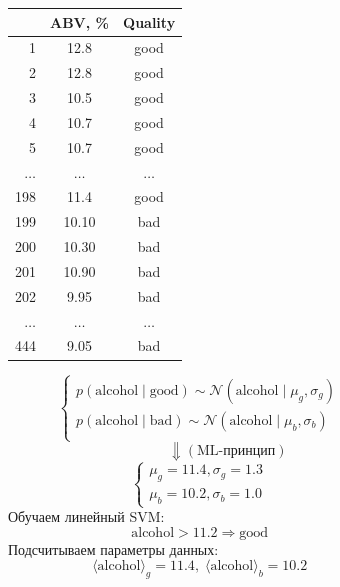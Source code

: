 \documentclass[aspectratio=169]{beamer}
\begin{document}
\begin{frame}
\begin{columns}[c]
    \begin{column}{.49\linewidth}
    \begin{footnotesize}
    \begin{overprint}
				\begin{center}			
			\begin{tabular}{r  c  c}
			& ABV, \% & Quality \\
			\hline
			1 & 12.8 & good \\
			2 & 12.8 & good \\
			3 & 10.5 & good \\
			4 & 10.7 & good \\
			5 & 10.7 & good \\
			$\ldots$ & $\ldots$ & $\ldots$ \\
			198 & 11.4 & good \\
			199 & 10.10 & bad \\
			200 & 10.30 & bad \\
			201 & 10.90 & bad \\
			202 & 9.95 & bad \\
			$\ldots$ & $\ldots$ & $\ldots$ \\
			444 & 9.05 & bad \\
			\end{tabular}
			\end{center}
			  \[
			\begin{cases}
			p( \text{alcohol} \mid \text{good} ) \sim \mathcal{N}(\text{alcohol} \mid \mu_g, \sigma_g) \\
			p( \text{alcohol} \mid \text{bad} ) \sim \mathcal{N}(\text{alcohol} \mid \mu_b, \sigma_b) \\
			\end{cases}
			\]
			\[
			\qquad\qquad\Downarrow (\text{ML-принцип})
			\]
			\[
			\begin{cases} 
			\mu_g=11.4, \sigma_g=1.3 \\ 
			\mu_b=10.2, \sigma_b=1.0
			\end{cases}
			\]
			  \onslide<3> 
			  Обучаем линейный SVM: 
			  \[\text{alcohol} > 11.2 \Rightarrow \text{good}\]
			  \onslide<4>
			  Подсчитываем параметры данных: \[\langle \text{alcohol} \rangle_g = 11.4,\; \langle \text{alcohol} \rangle_b = 10.2\]		
		\end{overprint}
		\end{footnotesize}
    \end{column}    
    \begin{column}{.49\linewidth}

\end{column}
\end{columns}
\end{frame}
\end{document}
